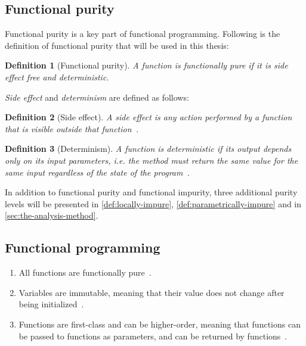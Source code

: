 \documentclass[a4paper,12pt]{article}
\newtheorem{definition}{Definition} %
\begin{document}
\subsection{Functional purity} \label{ssub:functional-purity-definition}

Functional purity is a key part of functional programming. Following is the definition of functional purity that will be used in this thesis:

\begin{definition}[Functional purity] \label{def:functional-purity}
  A function is functionally pure if it is \textit{side effect} free and \textit{deterministic}.
\end{definition}

\textit{Side effect} and \textit{determinism} are defined as follows:

\begin{definition}[Side effect] \label{def:side-effect}
  A side effect is any action performed by a function that is visible outside that function~\cite{purity-in-java}.
\end{definition}

\begin{definition}[Determinism] \label{def:determinism}
  A function is deterministic if its output depends only on its input parameters, i.e. the method must return the same value for the same input regardless of the state of the program~\cite{purity-in-java}.
\end{definition}

In addition to functional purity and functional impurity, three additional purity levels will be presented in \autoref{def:locally-impure}, \autoref{def:parametrically-impure} and in \autoref{sec:the-analysis-method}.

\subsection{Functional programming} \label{sub:functional-programming}

\begin{enumerate}
  \item All functions are functionally pure~\cite{alvin-alexander}.
  \item Variables are immutable, meaning that their value does not change after being initialized~\cite{alvin-alexander}. %
  \item Functions are first-class and can be higher-order, meaning that functions can be passed to functions as parameters, and can be returned by functions~\cite{jonas-walter}. %
\end{enumerate}
\end{document}
